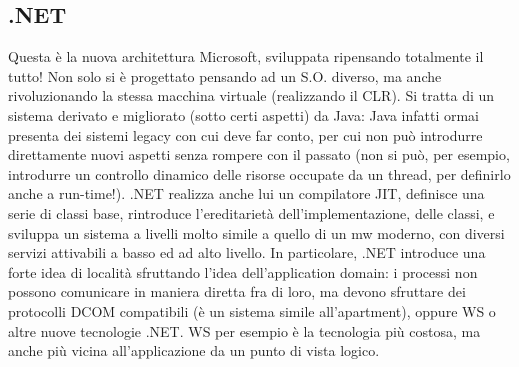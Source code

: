 \subsection{.NET}
Questa è la nuova architettura Microsoft, sviluppata ripensando totalmente il tutto! Non solo si è progettato pensando
ad un S.O. diverso, ma anche rivoluzionando la stessa macchina virtuale (realizzando il CLR). Si tratta di un sistema
derivato e migliorato (sotto certi aspetti) da Java: Java infatti ormai presenta dei sistemi legacy con cui deve far 
conto, per cui non può introdurre direttamente nuovi aspetti senza rompere con il passato (non si può, per esempio, 
introdurre un controllo dinamico delle risorse occupate da un thread, per definirlo anche a run-time!). .NET realizza 
anche lui un compilatore JIT, definisce una serie di classi base, rintroduce l'ereditarietà dell'implementazione, delle 
classi, e sviluppa un sistema a livelli molto simile a quello di un mw moderno, con diversi servizi attivabili a basso 
ed ad alto livello.
In particolare, .NET introduce una forte idea di località sfruttando l'idea dell'application domain: i processi non 
possono comunicare in maniera diretta fra di loro, ma devono sfruttare dei protocolli DCOM compatibili (è un sistema
simile all'apartment), oppure WS o altre nuove tecnologie .NET. WS per esempio è la tecnologia più costosa, ma anche più
vicina all'applicazione da un punto di vista logico.
